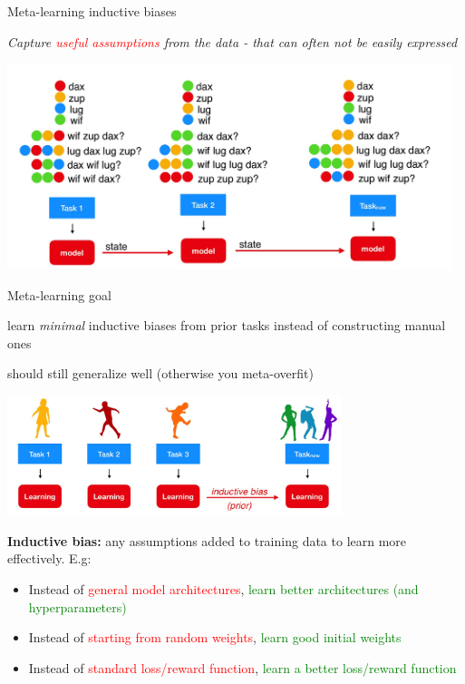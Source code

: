 \documentclass[aspectratio=169,t,handout,xcolor={usenames,dvipsnames}]{beamer}
\begin{document}
\begin{frame}{Meta-learning inductive biases}
\centerline{\textit{Capture \textcolor{red}{useful assumptions} from the data - that can often not be easily expressed}}
\centering\includegraphics[height=6cm]{image/Jietu20220328-193434.jpg}

\end{frame}

\begin{frame}{Meta-learning goal}
\centerline{learn \textit{minimal} inductive biases from prior tasks instead of constructing manual ones }
\centerline{should still generalize well (otherwise you meta-overfit)}
\centering\includegraphics[height=3.5cm]{image/Jietu20220328-193722.jpg}


\textbf{Inductive bias:} any assumptions added to training data to learn more effectively. E.g:
\begin{itemize}
  \item Instead of \textcolor{red}{general model architectures}, \textcolor{green}{learn better architectures (and hyperparameters)}
  \item Instead of \textcolor{red}{starting from random weights}, \textcolor{green}{learn good initial weights}
  \item Instead of \textcolor{red}{standard loss/reward function}, \textcolor{green}{learn a better loss/reward function}
\end{itemize}
\end{frame}
\end{document}
